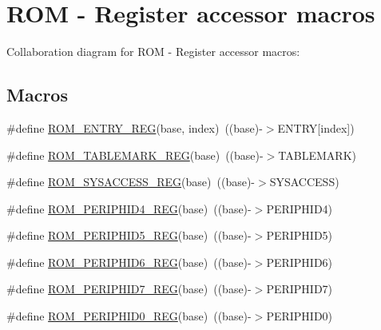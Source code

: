 \hypertarget{group___r_o_m___register___accessor___macros}{}\section{R\+OM -\/ Register accessor macros}
\label{group___r_o_m___register___accessor___macros}
Collaboration diagram for R\+OM -\/ Register accessor macros\+:
\subsection*{Macros}
\begin{DoxyCompactItemize}
\item 
\#define \hyperlink{group___r_o_m___register___accessor___macros_gab4e97748d1b7d5e8024f502e628709fa}{R\+O\+M\+\_\+\+E\+N\+T\+R\+Y\+\_\+\+R\+EG}(base,  index)~((base)-\/$>$E\+N\+T\+RY\mbox{[}index\mbox{]})
\item 
\#define \hyperlink{group___r_o_m___register___accessor___macros_gaf92010f49e8870d94588098c5f7b42d7}{R\+O\+M\+\_\+\+T\+A\+B\+L\+E\+M\+A\+R\+K\+\_\+\+R\+EG}(base)~((base)-\/$>$T\+A\+B\+L\+E\+M\+A\+RK)
\item 
\#define \hyperlink{group___r_o_m___register___accessor___macros_ga7dc11ad9e3be5913bed30c8a8749eaa8}{R\+O\+M\+\_\+\+S\+Y\+S\+A\+C\+C\+E\+S\+S\+\_\+\+R\+EG}(base)~((base)-\/$>$S\+Y\+S\+A\+C\+C\+E\+SS)
\item 
\#define \hyperlink{group___r_o_m___register___accessor___macros_ga41943ddb688f579c57887a4abe9df501}{R\+O\+M\+\_\+\+P\+E\+R\+I\+P\+H\+I\+D4\+\_\+\+R\+EG}(base)~((base)-\/$>$P\+E\+R\+I\+P\+H\+I\+D4)
\item 
\#define \hyperlink{group___r_o_m___register___accessor___macros_gadd1423bc7a8ebde255e7c2d422096bf0}{R\+O\+M\+\_\+\+P\+E\+R\+I\+P\+H\+I\+D5\+\_\+\+R\+EG}(base)~((base)-\/$>$P\+E\+R\+I\+P\+H\+I\+D5)
\item 
\#define \hyperlink{group___r_o_m___register___accessor___macros_ga172a468c57c46e3edf4f67910f6e8b0c}{R\+O\+M\+\_\+\+P\+E\+R\+I\+P\+H\+I\+D6\+\_\+\+R\+EG}(base)~((base)-\/$>$P\+E\+R\+I\+P\+H\+I\+D6)
\item 
\#define \hyperlink{group___r_o_m___register___accessor___macros_ga00f0b786d839d625a7d166b7185a2205}{R\+O\+M\+\_\+\+P\+E\+R\+I\+P\+H\+I\+D7\+\_\+\+R\+EG}(base)~((base)-\/$>$P\+E\+R\+I\+P\+H\+I\+D7)
\item 
\#define \hyperlink{group___r_o_m___register___accessor___macros_ga43347eab2982b34ff8b89e454ba08837}{R\+O\+M\+\_\+\+P\+E\+R\+I\+P\+H\+I\+D0\+\_\+\+R\+EG}(base)~((base)-\/$>$P\+E\+R\+I\+P\+H\+I\+D0)

\end{DoxyCompactItemize}
